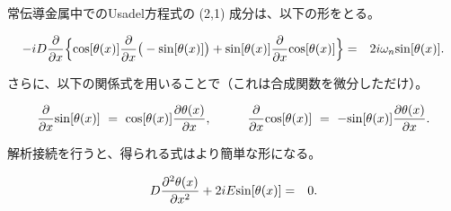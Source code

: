 \documentclass[uplatex,a4j,12pt,dvipdfmx]{jsarticle}
\begin{document}
常伝導金属中でのUsadel方程式の (2,1) 成分は、以下の形をとる。

\begin{eqnarray}
	-i D \dfrac{\partial}{\partial x}
	\Big\{ {\rm cos} [ \theta(x) ] \dfrac{\partial}{\partial x} \big( - {\rm sin} [ \theta(x)] \big)
	+ {\rm sin} [ \theta(x) ] \dfrac{\partial}{\partial x} {\rm cos} [ \theta(x)] \Big\}
	&=&
	2 i \omega_{n} {\rm sin} [ \theta(x) ]
	.
\end{eqnarray}

さらに、以下の関係式を用いることで（これは合成関数を微分しただけ）。

\begin{eqnarray}
	\dfrac{\partial}{\partial x} {\rm sin} [ \theta(x)]
	\ = \
	{\rm cos} [ \theta(x)] \dfrac{\partial \theta(x) }{\partial x}
	,
	\hspace{10mm}
	\dfrac{\partial}{\partial x} {\rm cos} [ \theta(x)]
	\ = \
	- {\rm sin} [ \theta(x)] \dfrac{\partial \theta(x) }{\partial x}
	.
\end{eqnarray}

解析接続を行うと、得られる式はより簡単な形になる。

\begin{eqnarray}
	D \dfrac{\partial^{2} \theta(x)}{\partial x^{2}}
	+
	2 i E {\rm sin} [ \theta(x) ]
	&=&
	0
	.
\end{eqnarray}
\end{document}
